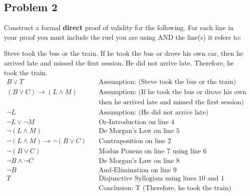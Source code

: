 \documentclass{math}
\begin{document}
\subsection*{Problem 2}
Construct a formal \textbf{direct} proof of validity for the following. For each
line in your proof you must include the ruel you are using AND the line(s) it
refers to:
\par Steve took the bus or the train. If he took the bus or drove his own car,
then he arrived late and missed the first session. He did not arrive late.
Therefore, he took the train.
\begin{align}
  B\vee T &\quad \text{Assumption: (Steve took the bus or the train)} \\
  (B\vee C)\to (L\wedge M) &\quad \text{Assumption: (If he took the bus or drove
  his own car,} \\
  &\quad \text{then he arrived late and missed the first session)} \\
  \neg L &\quad \text{Assumption: (He did not arrive late)} \\
  \neg L\vee\neg M &\quad \text{Or-Introduction on line 4} \\
  \neg(L\wedge M) &\quad \text{De Morgan's Law on line 5} \\
  \neg(L\wedge M)\to\neg(B\vee C) &\quad \text{Contraposition on line 2} \\
  \neg(B\vee C) &\quad \text{Modus Ponens on line 7 using line 6} \\
  \neg B\wedge\neg C &\quad \text{De Morgan's Law on line 8} \\
  \neg B &\quad \text{And-Elimination on line 9} \\
  T &\quad \text{Disjunctive Syllogism using lines 10 and 1} \\
  &\quad \text{Conclusion: T (Therefore, he took the train)}
\end{align}
\end{document}
